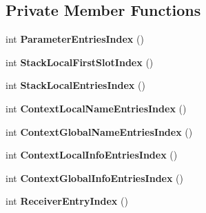 \subsection*{Private Member Functions}
\begin{DoxyCompactItemize}
\item 
int {\bfseries Parameter\+Entries\+Index} ()\hypertarget{classv8_1_1internal_1_1_scope_info_abd5161f5dee5405e300a41d0cd2a25a5}{}\label{classv8_1_1internal_1_1_scope_info_abd5161f5dee5405e300a41d0cd2a25a5}

\item 
int {\bfseries Stack\+Local\+First\+Slot\+Index} ()\hypertarget{classv8_1_1internal_1_1_scope_info_ae2220db5f56b7b8552e5ffe774b3a3e3}{}\label{classv8_1_1internal_1_1_scope_info_ae2220db5f56b7b8552e5ffe774b3a3e3}

\item 
int {\bfseries Stack\+Local\+Entries\+Index} ()\hypertarget{classv8_1_1internal_1_1_scope_info_ab4f528d6393338f5adf8e5757a6a529f}{}\label{classv8_1_1internal_1_1_scope_info_ab4f528d6393338f5adf8e5757a6a529f}

\item 
int {\bfseries Context\+Local\+Name\+Entries\+Index} ()\hypertarget{classv8_1_1internal_1_1_scope_info_a7092d14411f6dac0ca24c7f0dca1f5d4}{}\label{classv8_1_1internal_1_1_scope_info_a7092d14411f6dac0ca24c7f0dca1f5d4}

\item 
int {\bfseries Context\+Global\+Name\+Entries\+Index} ()\hypertarget{classv8_1_1internal_1_1_scope_info_a4e8d8e4bc4b557d1e68047d93e44cb1a}{}\label{classv8_1_1internal_1_1_scope_info_a4e8d8e4bc4b557d1e68047d93e44cb1a}

\item 
int {\bfseries Context\+Local\+Info\+Entries\+Index} ()\hypertarget{classv8_1_1internal_1_1_scope_info_ae724eff29926b3e2c6a9ec0b819f1da7}{}\label{classv8_1_1internal_1_1_scope_info_ae724eff29926b3e2c6a9ec0b819f1da7}

\item 
int {\bfseries Context\+Global\+Info\+Entries\+Index} ()\hypertarget{classv8_1_1internal_1_1_scope_info_a5d3d175c3981e2dbc2143dff2b5adca2}{}\label{classv8_1_1internal_1_1_scope_info_a5d3d175c3981e2dbc2143dff2b5adca2}

\item 
int {\bfseries Receiver\+Entry\+Index} ()\hypertarget{classv8_1_1internal_1_1_scope_info_a92c843485037e86452d8b4b9bb5270cc}{}\label{classv8_1_1internal_1_1_scope_info_a92c843485037e86452d8b4b9bb5270cc}


\end{DoxyCompactItemize}
